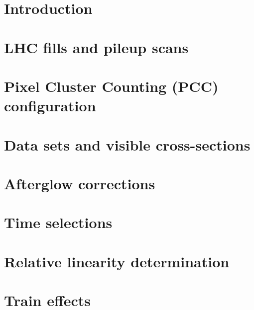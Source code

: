 \maketitle %
\section{Introduction}

\section{LHC fills and pileup scans}

\clearpage
\newpage
\section{Pixel Cluster Counting (PCC) configuration}

\clearpage
\newpage
\section{Data sets and visible cross-sections}

\clearpage
\newpage
\section{Afterglow corrections}

\clearpage
\newpage
\section{Time selections}

\clearpage
\newpage
\section{Relative linearity determination}

\clearpage
\newpage
\section{Train effects}

\clearpage
\newpage
